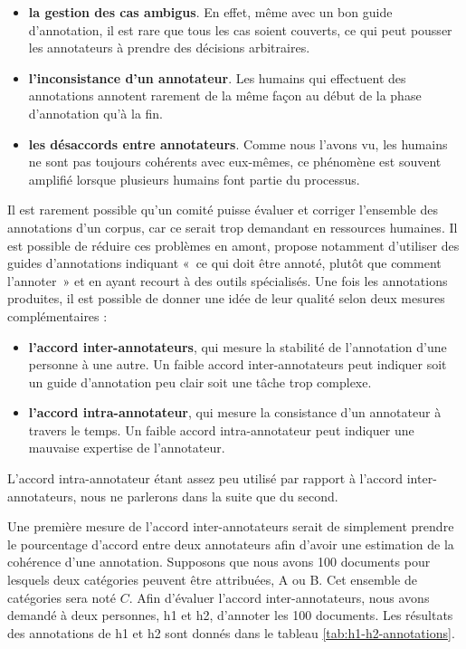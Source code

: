 \documentclass[12pt,a4paper,times,twoside,openright]{report}
\begin{document}
\begin{itemize}
    \item \textbf{la gestion des cas ambigus}. En effet, même avec un bon guide d'annotation, il est rare que tous les cas soient couverts, ce qui peut pousser les annotateurs à prendre des décisions arbitraires.
    \item \textbf{l'inconsistance d'un annotateur}. Les humains qui effectuent des annotations annotent rarement de la même façon au début de la phase d'annotation qu'à la fin.
    \item \textbf{les désaccords entre annotateurs}. Comme nous l'avons vu, les humains ne sont pas toujours cohérents avec eux-mêmes, ce phénomène est souvent amplifié lorsque plusieurs humains font partie du processus.
\end{itemize}

Il est rarement possible qu'un comité puisse évaluer et corriger l'ensemble des annotations d'un corpus, car ce serait trop demandant en ressources humaines. Il est possible de réduire ces problèmes en amont, \citet{fort2009towards} propose notamment d'utiliser des guides d'annotations indiquant «\ ce qui doit être annoté, plutôt que comment l'annoter\ » et en ayant recourt à des outils spécialisés. Une fois les annotations produites, il est possible de donner une idée de leur qualité selon deux mesures complémentaires :

\begin{itemize}
    \item \textbf{l'accord inter-annotateurs}, qui mesure la stabilité de l'annotation d'une personne à une autre. Un faible accord inter-annotateurs peut indiquer soit un guide d'annotation peu clair soit une tâche trop complexe.
    \item \textbf{l'accord intra-annotateur}, qui mesure la consistance d'un annotateur à travers le temps. Un faible accord intra-annotateur peut indiquer une mauvaise expertise de l'annotateur.
\end{itemize}

L'accord intra-annotateur étant assez peu utilisé par rapport à l'accord inter-annotateurs, nous ne parlerons dans la suite que du second.

Une première mesure de l'accord inter-annotateurs serait de simplement prendre le pourcentage d'accord entre deux annotateurs afin d'avoir une estimation de la cohérence d'une annotation. Supposons que nous avons 100 documents pour lesquels deux catégories peuvent être attribuées, A ou B. Cet ensemble de catégories sera noté $C$. Afin d'évaluer l'accord inter-annotateurs, nous avons demandé à deux personnes, h1 et h2, d'annoter les 100 documents. Les résultats des annotations de h1 et h2 sont donnés dans le tableau \ref{tab:h1-h2-annotations}.
\end{document}

